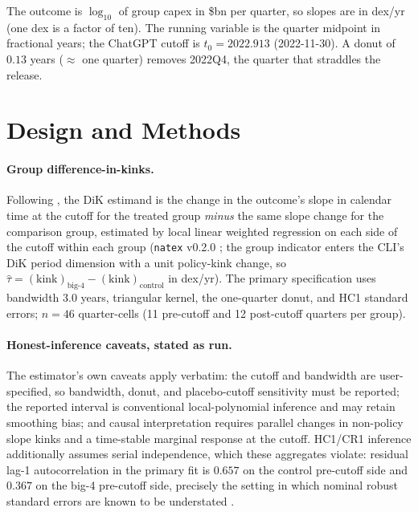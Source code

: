 \documentclass[11pt]{article}
\newcommand{\natex}{\texttt{natex}}
\begin{document}
The outcome is $\log_{10}$ of group capex in \$bn per quarter, so slopes are
in dex/yr (one dex is a factor of ten). The running variable is the quarter
midpoint in fractional years; the ChatGPT cutoff is $t_0=2022.913$
(2022-11-30). A donut of $0.13$ years ($\approx$ one quarter) removes 2022Q4,
the quarter that straddles the release.

\section{Design and Methods}\label{sec:methods}

\paragraph{Group difference-in-kinks.} Following \cite{bockerman2025}, the DiK
estimand is the change in the outcome's slope in calendar time at the cutoff
for the treated group \emph{minus} the same slope change for the comparison
group, estimated by local linear weighted regression on each side of the
cutoff within each group (\natex{} v0.2.0 \cite{natex}; the group indicator
enters the CLI's DiK period dimension with a unit policy-kink change, so
$\hat\tau = (\text{kink})_{\text{big-4}} - (\text{kink})_{\text{control}}$ in
dex/yr). The primary specification uses bandwidth 3.0 years, triangular
kernel, the one-quarter donut, and HC1 standard errors; $n=46$ quarter-cells
(11 pre-cutoff and 12 post-cutoff quarters per group).

\paragraph{Honest-inference caveats, stated as run.} The estimator's own
caveats apply verbatim: the cutoff and bandwidth are user-specified, so
bandwidth, donut, and placebo-cutoff sensitivity must be reported; the
reported interval is conventional local-polynomial inference and may retain
smoothing bias; and causal interpretation requires parallel changes in
non-policy slope kinks and a time-stable marginal response at the cutoff.
HC1/CR1 inference additionally assumes serial independence, which these
aggregates violate: residual lag-1 autocorrelation in the primary fit is
$0.657$ on the control pre-cutoff side and $0.367$ on the big-4 pre-cutoff
side, precisely the setting in which nominal robust standard errors are known
to be understated \cite{bertrand2004}.
\end{document}
